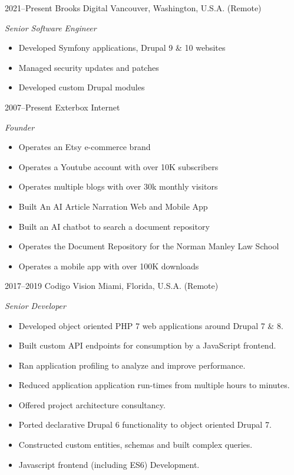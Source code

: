 \documentclass[]{friggeri-cv} %
\begin{document}
\begin{entrylist}

\entry
{2021--Present}
{Brooks Digital}
{Vancouver, Washington, U.S.A. (Remote)}
{\emph{Senior Software Engineer}
\begin{itemize}
\item Developed Symfony applications, Drupal 9 \& 10 websites
\item Managed security updates and patches
\item Developed custom Drupal modules
\end{itemize}}

\entry
{2007--Present}
{Exterbox}
{Internet}
{\emph{Founder}
\begin{itemize}
\item Operates an Etsy e-commerce brand
\item Operates a Youtube account with over 10K subscribers
\item Operates multiple blogs with over 30k monthly visitors
\item Built An AI Article Narration Web and Mobile App
\item Built an AI chatbot to search a document repository
\item Operates the Document Repository for the Norman Manley Law School
\item Operates a mobile app with over 100K downloads
\end{itemize}}


\entry
{2017--2019}
{Codigo Vision}
{Miami, Florida, U.S.A. (Remote)}
{\emph{Senior Developer}
\begin{itemize}
\item Developed object oriented PHP 7 web applications around Drupal 7 \& 8.
\item Built custom API endpoints for consumption by a JavaScript frontend.
\item Ran application profiling to analyze and improve performance.
\item Reduced application application run-times from multiple hours to minutes.
\item Offered project architecture consultancy.
\item Ported declarative Drupal 6 functionality to object oriented Drupal 7.
\item Constructed custom entities, schemas and built complex queries.
\item Javascript frontend (including ES6) Development.
\end{itemize}}


\end{entrylist}
\end{document}
